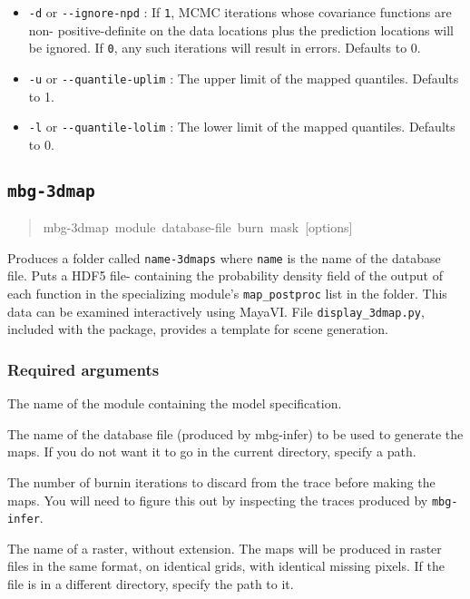 \begin{itemize}
\item \texttt{-d} or \texttt{-{}-ignore-npd} : If \texttt{1}, MCMC iterations whose covariance functions are non-
positive-definite on the data locations plus the prediction locations will be ignored. If
\texttt{0}, any such iterations will result in errors. Defaults to 0.

\item \texttt{-u} or \texttt{-{}-quantile-uplim} : The upper limit of the mapped quantiles. Defaults to 1.

\item \texttt{-l} or \texttt{-{}-quantile-lolim} : The lower limit of the mapped quantiles. Defaults to 0.

\end{itemize}




\subsection{\texttt{mbg-3dmap}%
}
%
\begin{quote}{\ttfamily \raggedright \noindent
mbg-3dmap~module~database-file~burn~mask~{[}options{]}
}
\end{quote}

Produces a folder called \texttt{name-3dmaps} where \texttt{name} is the name of the database file.
Puts a HDF5 file- containing the probability density field of the output of each function
in the specializing module's \texttt{map\_postproc} list in the folder. This data can be examined
interactively using MayaVI. File \texttt{display\_3dmap.py}, included with the package, provides
a template for scene generation.




\subsubsection{Required arguments%
}
\setcounter{listcnt0}{0}
\begin{list}{.}
{
\setlength{\rightmargin}{\leftmargin}
}

\item The name of the module containing the model specification.

\item The name of the database file (produced by mbg-infer) to be used to generate the
maps. If you do not want it to go in the current directory, specify a path.

\item The number of burnin iterations to discard from the trace before making the maps.
You will need to figure this out by inspecting the traces produced by \texttt{mbg-infer}.

\item The name of a raster, without extension. The maps will be produced in raster files
in the same format, on identical grids, with identical missing pixels. If the file
is in a different directory, specify the path to it.
\end{list}





